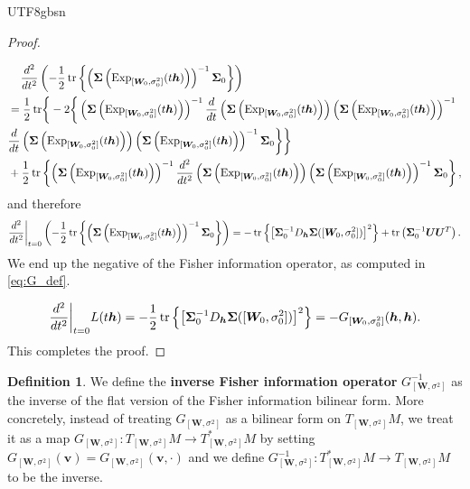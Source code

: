 \documentclass[12pt]{report}
\newcommand\tab[1][1cm]{\hspace*{#1}}
\newcommand{\bracket}[1]{\left ( #1 \right )}
\newcommand{\curly}[1]{\left \{ #1 \right \} }
\newcommand{\squared}[1]{\left [ #1 \right ]}
\theoremstyle{plain}
\theoremstyle{definition}
\newtheorem{definition}[theorem]{Definition}
\begin{document}
\begin{CJK*}{UTF8}{gbsn}
\begin{proof}
\begin{equation*}
\begin{split}
  \end{split}
\end{equation*}
\begin{equation*}
  \begin{split}
  & \tab[0.4cm] \frac{d^2}{dt^2} \bracket{- \frac{1}{2} \tr\curly{
  \bracket{\bm{\Sigma}\bracket{\text{Exp}_{[\bm{W}_0, \sigma_0^2]}(t\bm{h})}}^{-1} \bm{\Sigma}_0}}
  \\ & = 
  \frac{1}{2} \tr 
  \biggr \{-2
  \biggr \{ \bracket{\bm{\Sigma}\bracket{\text{Exp}_{[\bm{W}_0, \sigma_0^2]}(t\bm{h})}}^{-1}
  \frac{d}{dt} \bracket{\bm{\Sigma}\bracket{\text{Exp}_{[\bm{W}_0, \sigma_0^2]}(t\bm{h})}}
  \bracket{\bm{\Sigma}\bracket{\text{Exp}_{[\bm{W}_0, \sigma_0^2]}(t\bm{h})}}^{-1}
  \\ & \frac{d}{dt} \bracket{\bm{\Sigma}\bracket{\text{Exp}_{[\bm{W}_0, \sigma_0^2]}(t\bm{h})}}
  \bracket{\bm{\Sigma}\bracket{\text{Exp}_{[\bm{W}_0, \sigma_0^2]}(t\bm{h})}}^{-1}\bm{\Sigma}_0
  \biggr \} \biggr \} \\ & +
  \frac{1}{2} \tr 
  \curly{\bracket{\bm{\Sigma}\bracket{\text{Exp}_{[\bm{W}_0, \sigma_0^2]}(t\bm{h})}}^{-1}
  \frac{d^2}{dt^2} \bracket{\bm{\Sigma}\bracket{\text{Exp}_{[\bm{W}_0, \sigma_0^2]}(t\bm{h})}}
  \bracket{\bm{\Sigma}\bracket{\text{Exp}_{[\bm{W}_0, \sigma_0^2]}(t\bm{h})}}^{-1}\bm{\Sigma}_0},
  \end{split}
\end{equation*}
and therefore
\begin{equation*}
  \frac{d^2}{dt^2}\bigg|_{t=0} \bracket{- \frac{1}{2} \tr\curly{
  \bracket{\bm{\Sigma}\bracket{\text{Exp}_{[\bm{W}_0, \sigma_0^2]}(t\bm{h})}}^{-1} \bm{\Sigma}_0}}
  = - \tr \curly{\squared{\bm{\Sigma}_0^{-1}D_{\bm{h}} \bm{\Sigma}([\bm{W}_0, \sigma_0^2])}^2}
  + \tr \bracket{\bm{\Sigma}_0^{-1} \bm{U}\bm{U}^T}.
\end{equation*}
We end up the negative of the Fisher information operator, as computed in \eqref{eq:G_def}.

\begin{equation*}
  \frac{d^2}{dt^2}\bigg|_{t=0} L(t \bm{h}) = - \frac{1}{2}
  \tr \curly{\squared{\bm{\Sigma}_0^{-1}D_{\bm{h}} \bm{\Sigma}([\bm{W}_0, \sigma_0^2])}^2}
  = - G_{[\bm{W}_0, \sigma_0^2]}(\bm{h}, \bm{h}).
\end{equation*}
This completes the proof.
\end{proof}

\begin{definition}\label{def:G_inverse}
We define the \textbf{inverse Fisher information operator} $G_{[\bm{W}, \sigma^2]}^{-1}$
as the inverse of the flat version of the Fisher information bilinear form.
More concretely, instead of treating $G_{[\bm{W}, \sigma^2]}$ as a bilinear form on $T_{[\bm{W}, \sigma^2]}M$,
we treat it as a map $G_{[\bm{W}, \sigma^2]}: T_{[\bm{W}, \sigma^2]}M \to T^*_{[\bm{W}, \sigma^2]}M$
by setting $G_{[\bm{W}, \sigma^2]}(\bm{v}) = G_{[\bm{W}, \sigma^2]}(\bm{v}, \cdot)$
and we define $G_{[\bm{W}, \sigma^2]}^{-1}: T^*_{[\bm{W}, \sigma^2]}M \to T_{[\bm{W}, \sigma^2]}M$
to be the inverse.
\end{definition}


\end{CJK*}
\end{document}
